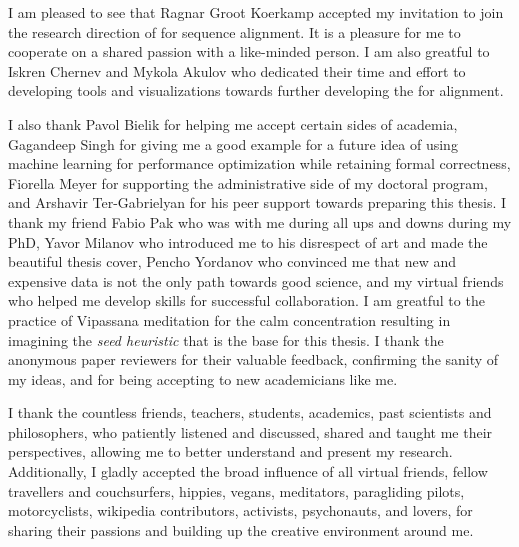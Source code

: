 I am pleased to see that Ragnar Groot Koerkamp accepted my invitation to join
the research direction of \A for sequence alignment. It is a pleasure for me to
cooperate on a shared passion with a like-minded person. I am also greatful to
Iskren Chernev and Mykola Akulov who dedicated their time and effort to
developing tools and visualizations towards further developing the \A for
alignment.

I also thank Pavol Bielik for helping me accept certain sides of academia,
Gagandeep Singh for giving me a good example for a future idea of using machine
learning for performance optimization while retaining formal correctness,
Fiorella Meyer for supporting the administrative side of my doctoral program,
and Arshavir Ter-Gabrielyan for his peer support towards preparing this thesis.
I thank my friend Fabio Pak who was with me during all ups and downs during my
PhD, Yavor Milanov who introduced me to his disrespect of art and made the
beautiful thesis cover, Pencho Yordanov who convinced me that new and expensive
data is not the only path towards good science, and my virtual friends who
helped me develop skills for successful collaboration. I am greatful to the
practice of Vipassana meditation for the calm concentration resulting in
imagining the \emph{seed heuristic} that is the base for this thesis. I thank
the anonymous paper reviewers for their valuable feedback, confirming the sanity
of my ideas, and for being accepting to new academicians like me. 

I thank the countless friends, teachers, students, academics, past scientists
and philosophers, who patiently listened and discussed, shared and taught me
their perspectives, allowing me to better understand and present my research.
Additionally, I gladly accepted the broad influence of all virtual friends,
fellow travellers and couchsurfers, hippies, vegans, meditators, paragliding
pilots, motorcyclists, wikipedia contributors, activists, psychonauts, and
lovers, for sharing their passions and building up the creative environment
around me.

\endgroup
